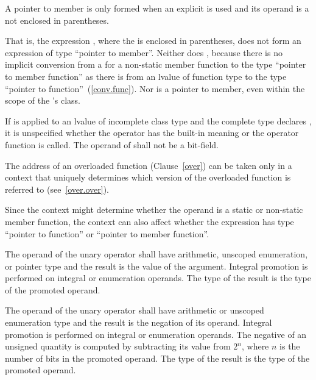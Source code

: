 \pnum
A pointer to member is only formed when an explicit \tcode{\&} is used
and its operand is a  not enclosed in
parentheses.
\begin{note}
That is, the expression , where the
 is enclosed in parentheses, does not form an
expression of type ``pointer to member''. Neither does
, because there is no implicit conversion from a
 for a non-static member function to the type
``pointer to member function'' as there is from an lvalue of function
type to the type ``pointer to function''~(\ref{conv.func}). Nor is
 a pointer to member, even within the scope of
the 's class.
\end{note}

\pnum
If \tcode{\&} is applied to an lvalue of incomplete class type and the
complete type declares , it is unspecified whether
the operator has the built-in meaning or the operator function is
called. The operand of \tcode{\&} shall not be a bit-field.

\pnum
{}%
The address of an overloaded function (Clause~\ref{over}) can be taken
only in a context that uniquely determines which version of the
overloaded function is referred to (see~\ref{over.over}).
\begin{note}
Since the context might determine whether the operand is a static or
non-static member function, the context can also affect whether the
expression has type ``pointer to function'' or ``pointer to member
function''.
\end{note}

\pnum
{}%
The operand of the unary \tcode{+} operator shall have arithmetic, unscoped
enumeration, or pointer type and the result is the value of the
argument. Integral promotion is performed on integral or enumeration
operands. The type of the result is the type of the promoted operand.

\pnum
{}%
The operand of the unary \tcode{-} operator shall have arithmetic or unscoped
enumeration type and the result is the negation of its operand. Integral
promotion is performed on integral or enumeration operands. The negative
of an unsigned quantity is computed by subtracting its value from $2^n$,
where $n$ is the number of bits in the promoted operand. The type of the
result is the type of the promoted operand.


